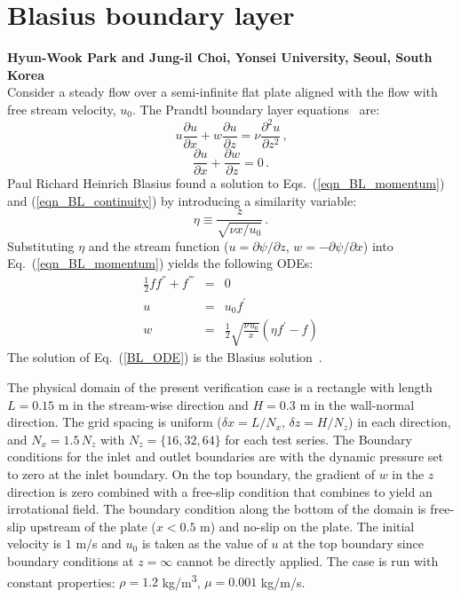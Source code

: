 \documentclass[11pt]{book}
\begin{document}
\section{Blasius boundary layer}
\label{sec:blasius}

\textbf{Hyun-Wook Park and Jung-il Choi, Yonsei University, Seoul, South Korea}\\

\noindent Consider a steady flow over a semi-infinite flat plate aligned with the flow with free stream velocity, $u_0$. The Prandtl boundary layer equations~\cite{Panton:1} are:
\begin{equation}
\label{eqn_BL_momentum}
u \frac{\partial u}{\partial x} + w \frac{\partial u}{\partial z} = \nu \frac{\partial^2 u}{\partial z^2} \,\mbox{,}
\end{equation}
\begin{equation}
\label{eqn_BL_continuity}
\frac{\partial u}{\partial x}+\frac{\partial w}{\partial z} = 0 \,\mbox{.}
\end{equation}
Paul Richard Heinrich Blasius found a solution to Eqs.~(\ref{eqn_BL_momentum}) and (\ref{eqn_BL_continuity}) by introducing a similarity variable:
\begin{equation}
\label{eta}
\eta\equiv\frac{z}{\sqrt{\nu x/u_0}} \,\mbox{.}
\end{equation}
Substituting $\eta$ and the stream function ($u = \partial \psi/\partial z$, $w = -\partial \psi/\partial x$) into Eq.~(\ref{eqn_BL_momentum}) yields the following ODEs:
\begin{eqnarray}
\label{BL_ODE}
\frac{1}{2}f f^{''}+f^{'''}&=&0 \\
u&=&u_0 f^{'} \\
w&=&\frac{1}{2}\sqrt{\frac{\nu \,u_0}{x}}(\eta f^{'}-f)
\end{eqnarray}
The solution of Eq.~(\ref{BL_ODE}) is the Blasius solution~\cite{Panton:1}.

The physical domain of the present verification case is a rectangle with length $L=0.15$ m in the stream-wise direction and $H=0.3$ m in the wall-normal direction. The grid spacing is uniform ($\delta x = L/N_x$, $\delta z =H/N_z$) in each direction, and $N_x = 1.5 \, N_z$ with $N_z = \{16, 32, 64\}$ for each test series. The Boundary conditions for the inlet and outlet boundaries are  with the dynamic pressure set to zero at the inlet boundary. On the top boundary, the gradient of $w$ in the $z$ direction is zero combined with a free-slip condition that combines to yield an irrotational field. The boundary condition along the bottom of the domain is free-slip upstream of the plate ($x<0.5$ m) and no-slip on the plate. The initial velocity is $1$ m/s and $u_0$ is taken as the value of $u$ at the top boundary since boundary conditions at $z=\infty$ cannot be directly applied. The case is run with constant properties: $\rho=1.2$ \unit{kg/m^3}, $\mu = 0.001$ kg/m/s.
\end{document}
